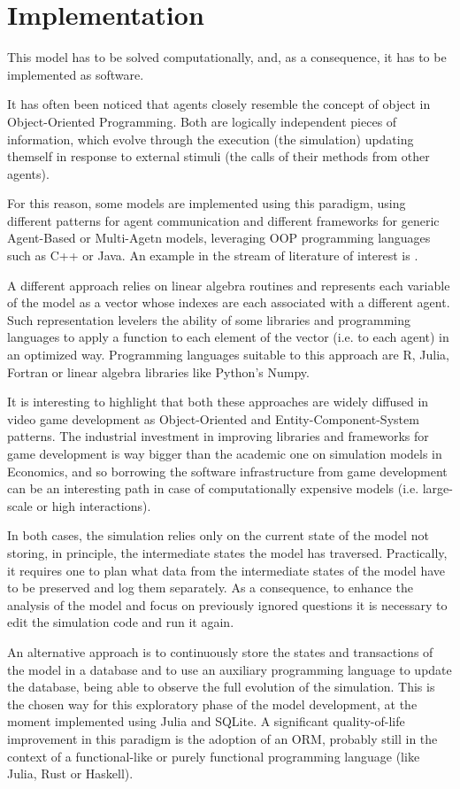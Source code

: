 \documentclass[a4paper, headings=standardclasses]{scrartcl}
\begin{document}
\section{Implementation}
This model has to be solved computationally, and, as a consequence, it has to be implemented as software.

It has often been noticed that agents closely resemble the concept of object in Object-Oriented Programming. Both are logically independent pieces of information, which evolve through the execution (the simulation) updating themself in response to external stimuli (the calls of their methods from other agents).

For this reason, some models are implemented using this paradigm, using different patterns for agent communication and different frameworks for generic Agent-Based or Multi-Agetn models, leveraging OOP programming languages such as C++ or Java. An example in the stream of literature of interest is \textcite{caiani2016}.

A different approach relies on linear algebra routines and represents each variable of the model as a vector whose indexes are each associated with a different agent. Such representation levelers the ability of some libraries and programming languages to apply a function to each element of the vector (i.e. to each agent) in an optimized way. Programming languages suitable to this approach are R, Julia, Fortran or linear algebra libraries like Python's Numpy.

It is interesting to highlight that both these approaches are widely diffused in video game development as Object-Oriented and Entity-Component-System patterns. The industrial investment in improving libraries and frameworks for game development is way bigger than the academic one on simulation models in Economics, and so borrowing the software infrastructure from game development can be an interesting path in case of computationally expensive models (i.e. large-scale or high interactions).

In both cases, the simulation relies only on the current state of the model not storing, in principle, the intermediate states the model has traversed. Practically, it requires one to plan what data from the intermediate states of the model have to be preserved and log them separately. As a consequence, to enhance the analysis of the model and focus on previously ignored questions it is necessary to edit the simulation code and run it again.

An alternative approach is to continuously store the states and transactions of the model in a database and to use an auxiliary programming language to update the database, being able to observe the full evolution of the simulation.
This is the chosen way for this exploratory phase of the model development, at the moment implemented using Julia and SQLite. A significant quality-of-life improvement in this paradigm is the adoption of an ORM, probably still in the context of a functional-like or purely functional programming language (like Julia, Rust or Haskell).
\end{document}
